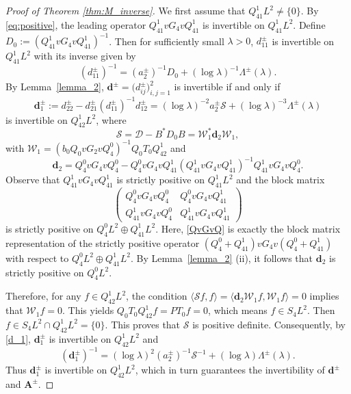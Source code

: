 \documentclass[reqno]{amsart}
\numberwithin{equation}{section}
\begin{document}
\begin{proof}[Proof of Theorem \ref{thm:M_inverse}]
	We first assume that
		$
		Q_{41}^1L^2\neq\{0\}.
		$
		By \eqref{eq:positive}, the leading operator $Q_{41}^1 v G_4 v Q_{41}^1$ is invertible on $Q_{41}^1 L^2$. Define $D_0 := (Q_{41}^1 v G_4 v Q_{41}^1)^{-1}$. Then for sufficiently small $\lambda>0$, $d_{11}^\pm$ is invertible on $Q_{41}^1 L^2$ with its inverse given by  
		\[  
		(d_{11}^\pm)^{-1} = (a_2^\pm)^{-1} D_0 + (\log \lambda)^{-1}\Lambda^\pm(\lambda).
		\]  
		 By Lemma~\ref{lemma_2}, $\boldsymbol{d}^\pm=\bigl(d^\pm_{ij}\bigr)_{i,j=1}^2$ is invertible if and only if
		\begin{equation}\label{d_1}
			\boldsymbol{d}^\pm_1 := d_{22}^\pm - d_{21}^\pm (d_{11}^\pm)^{-1} d_{12}^\pm = (\log \lambda)^{-2} a_2^\pm \mathcal{S} + (\log \lambda)^{-3}\Lambda^\pm(\lambda)
		\end{equation}
		is invertible on $Q_{42}^1 L^2$, where
\begin{equation*}
			\mathcal{S} = \mathcal{D} - B^* D_0 B=\mathcal{W}_1^* \boldsymbol{d}_2 \mathcal{W}_1,
		\end{equation*}
		with $\mathcal{W}_1 = (b_0 Q_0 v G_2 v Q_4^0)^{-1} Q_0 T_0 Q_{42}^1$ and
		$$
		\boldsymbol{d}_2 = Q_4^0 v G_4 v Q_4^0 - Q_4^0 v G_4 v Q_{41}^1 (Q_{41}^1 v G_4 v Q_{41}^1)^{-1} Q_{41}^1 v G_4 v Q_4^0.
		$$
		Observe that $Q_{41}^1 v G_4 v Q_{41}^1$ is strictly positive on $Q_{41}^1 L^2$ and the block matrix
		\begin{equation}\label{QvGvQ}
			\begin{pmatrix}
				Q_{4}^0 v G_4 v Q_{4}^0 & Q_{4}^0 v G_4 v Q_{41}^1 \\
				Q_{41}^1 v G_4 v Q_{4}^0 & Q_{41}^1 v G_4 v Q_{41}^1
			\end{pmatrix}
		\end{equation}
		is strictly positive on $Q_{4}^0 L^2 \oplus Q_{41}^1 L^2$. Here, \eqref{QvGvQ} is exactly the block matrix representation of the strictly positive operator $(Q_4^0+Q_{41}^1)v G_4 v (Q_4^0+Q_{41}^1)$ with respect to $Q_{4}^0 L^2 \oplus Q_{41}^1 L^2$. By Lemma~\ref{lemma_2} (ii), it follows that $\boldsymbol{d}_2$ is strictly positive on $Q_{4}^0 L^2$.
		
		Therefore, for any $f \in Q_{42}^1 L^2$, the condition $\langle \mathcal{S} f, f \rangle = \langle \boldsymbol{d}_2 \mathcal{W}_1 f, \mathcal{W}_1 f \rangle = 0$ implies that $\mathcal{W}_1 f = 0$. This yields $Q_0 T_0 Q_{42}^1 f = P T_0 f = 0$, which means $f \in S_4 L^2$. Then  $f \in S_4 L^2 \cap Q_{42}^1 L^2 = \{0\}$. 
		This proves that $\mathcal{S}$ is positive definite. Consequently, by \eqref{d_1}, $\boldsymbol{d}_1^\pm$ is invertible on $Q_{42}^1 L^2$  and 
		\[
		(\boldsymbol{d}_1^\pm)^{-1} = (\log \lambda)^{2} (a_2^\pm)^{-1} \mathcal{S}^{-1} + (\log \lambda)\Lambda^\pm(\lambda).
		\]
		Thus $\boldsymbol{d}_1^\pm$ is invertible on $Q_{42}^1 L^2$, which in turn guarantees the invertibility of $\boldsymbol{d}^\pm$ and $\mathbf{A}^\pm$.
        

\end{proof}
\end{document}
